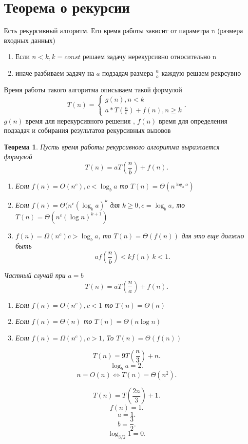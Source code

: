 \documentclass[14pt]{extarticle}
\newtheorem{theorem}{Теорема}
\begin{document}
    \section{Теорема о рекурсии}
    Есть рекурсивный алгоритм. Его время работы зависит от параметра n (размера входных данных)
    \begin{enumerate}
        \item Если $n < k, k = const$ решаем задачу нерекурсивно относительно n
        \item иначе разбиваем задачу на  $a$ подзадач размера  $\frac{n}{b}$ каждую решаем рекрсувно
    \end{enumerate}
    Время работы такого алгоритма описываем такой формулой
    \[
    T(n) = 
    \begin{cases}
        g(n), n < k\\
        a * T(\frac{n}{b}) + f(n), n\ge  k
    \end{cases}
    .\] 
    $g(n)$ время для нерекурсивного решения ,  $f(n)$ время для определения подзадач и собирания результатов рекурсивных вызовов
     \begin{theorem}
        Пусть время работы рекурсивного алгоритма выражается формулой
        \[
        T(n) = aT(\frac{n}{b}) + f(n)
        .\] 
        \begin{enumerate}
            \item Если $f(n) = O(n^{c}), c< \log_{b}{a}$ то $T(n) = \Theta(n^{\log_{b}a})$
            \item Если $f(n) = \Theta(n^{c} (\log_{b}a)^{k}$ для $k\ge 0, c= \log_{b}a$, то $T(n) =\Theta(n^{c} (\log{n})^{k+1})$
             \item $f(n) = \Omega(n^{c}) c > \log_{b}a$, то $T(n) = \Theta(f(n))$ 
                 для это еще должно быть
                 \[
                 a f(\frac{n}{b}) < k f(n) ~ k < 1
                 .\] 
        \end{enumerate}
        Частный случай при $a = b$
         \[
        T(n) = a T(\frac{n}{a}) + f(n)
        .\] 
        \begin{enumerate}
            \item Если $f(n) = O(n^{c}) ,c<1$ то $T(n) = \Theta(n)$
            \item Если  $f(n) =  \Theta(n)$ то  $T(n) = \Theta(n \log{n})$
            \item Если $f(n) = \Omega(n^{c}), c> 1$, То $T(n) = \Theta(f(n))$
        \end{enumerate}
    \end{theorem}
    \begin{exmp}
        \[
        T(n) = 9T(\frac{n}{3}) + n
        .\] 
        \[
            \log_{b}{a} = 2
        .\] 
        \[
        n = O(n) \iff T(n) = \Theta(n^{2})
        .\] 
    \end{exmp}
    \begin{exmp}
        \[
        T(n)=T (\frac{2 n}{3}) +1
        .\] 
        \[
        f(n) = 1
        .\] 
        \[
        a = 1
        .\] 
        \[
        b = \frac{3}{2}
        .\] 
        \[
            \log_{3/2} 1 = 0
        .\] 
    \end{exmp}
\end{document}
